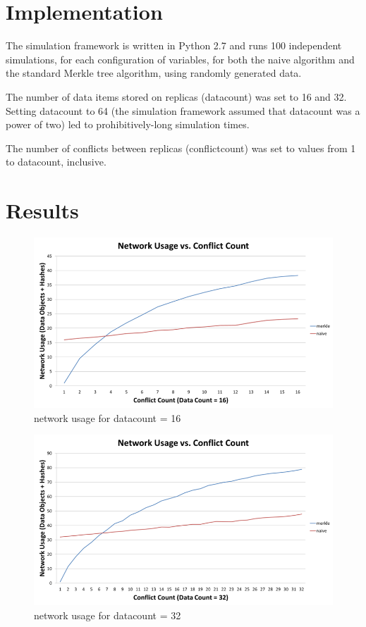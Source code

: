 \documentclass[11pt,letterpaper]{article}
\begin{document}
\section{Implementation}
The simulation framework is written in Python 2.7 and runs 100 independent simulations, for each configuration of variables, for both the naive algorithm and the standard Merkle tree algorithm, using randomly generated data.

The number of data items stored on replicas (datacount) was set to 16 and 32. Setting datacount to 64 (the simulation framework assumed that datacount was a power of two) led to prohibitively-long simulation times.

The number of conflicts between replicas (conflictcount) was set to values from 1 to datacount, inclusive.

\section{Results}
\begin{figure}[hbtp]
\caption{network usage for datacount = 16}
\centering
\includegraphics[scale=0.7]{results16.png} 
\end{figure}

\begin{figure}[hbtp]
\caption{network usage for datacount = 32}
\centering
\includegraphics[scale=0.7]{results32.png} 
\end{figure}
\end{document}
